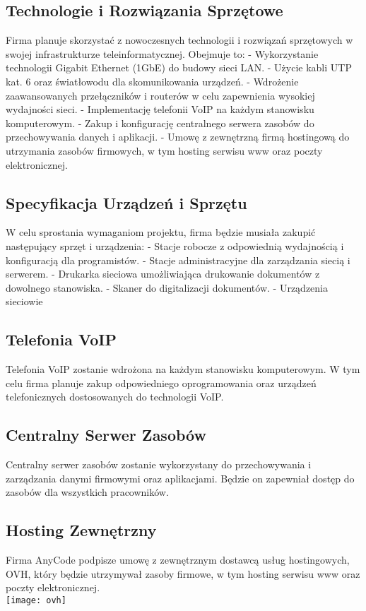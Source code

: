 \subsection{Technologie i Rozwiązania Sprzętowe}

Firma planuje skorzystać z nowoczesnych technologii i rozwiązań sprzętowych w swojej infrastrukturze teleinformatycznej. Obejmuje to:
- Wykorzystanie technologii Gigabit Ethernet (1GbE) do budowy sieci LAN.
- Użycie kabli UTP kat. 6 oraz światłowodu dla skomunikowania urządzeń.
- Wdrożenie zaawansowanych przełączników i routerów w celu zapewnienia wysokiej wydajności sieci.
- Implementację telefonii VoIP na każdym stanowisku komputerowym.
- Zakup i konfigurację centralnego serwera zasobów do przechowywania danych i aplikacji.
- Umowę z zewnętrzną firmą hostingową do utrzymania zasobów firmowych, w tym hosting serwisu www oraz poczty elektronicznej.

\subsection{Specyfikacja Urządzeń i Sprzętu}

W celu sprostania wymaganiom projektu, firma będzie musiała zakupić następujący sprzęt i urządzenia:
- Stacje robocze z odpowiednią wydajnością i konfiguracją dla programistów.
- Stacje administracyjne dla zarządzania siecią i serwerem.
- Drukarka sieciowa umożliwiająca drukowanie dokumentów z dowolnego stanowiska.
- Skaner do digitalizacji dokumentów.
- Urządzenia sieciowie

\subsection{Telefonia VoIP}

Telefonia VoIP zostanie wdrożona na każdym stanowisku komputerowym. W tym celu firma planuje zakup odpowiedniego oprogramowania oraz urządzeń telefonicznych dostosowanych do technologii VoIP.

\subsection{Centralny Serwer Zasobów}

Centralny serwer zasobów zostanie wykorzystany do przechowywania i zarządzania danymi firmowymi oraz aplikacjami. Będzie on zapewniał dostęp do zasobów dla wszystkich pracowników.

\subsection{Hosting Zewnętrzny}

Firma AnyCode podpisze umowę z zewnętrznym dostawcą usług hostingowych, OVH, który będzie utrzymywał zasoby firmowe, w tym hosting serwisu www oraz poczty elektronicznej.
\\
\texttt{[image: ovh]} \\
